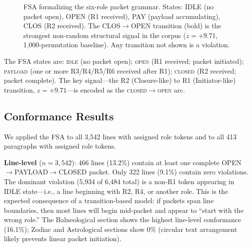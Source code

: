 \documentclass[11pt,a4paper,twocolumn]{article}
\begin{document}
\begin{figure}[H]
\centering
{}
\caption{FSA formalizing the six-role packet grammar. States: IDLE (no packet open), OPEN (R1 received), PAY (payload accumulating), CLOS (R2 received). The CLOS$\to$OPEN transition (bold) is the strongest non-random structural signal in the corpus ($z = +9.71$, 1,000-permutation baseline). Any transition not shown is a violation.}
\label{fig:fsa}
\end{figure}

The FSA states are: \textsc{idle} (no packet open); \textsc{open} (R1 received; packet initiated); \textsc{payload} (one or more R3/R4/R5/R6 received after R1); \textsc{closed} (R2 received; packet complete). The key signal---the R2 (Closure-like) to R1 (Initiator-like) transition, $z = +9.71$---is encoded as the \textsc{closed}$\to$\textsc{open} arc.

\subsection{Conformance Results}

We applied the FSA to all 3,542 lines with assigned role tokens and to all 413 paragraphs with assigned role tokens.

\textbf{Line-level} ($n = 3{,}542$): 466 lines (13.2\%) contain at least one complete OPEN$\to$PAYLOAD$\to$CLOSED packet. Only 322 lines (9.1\%) contain zero violations. The dominant violation (5,934 of 6,484 total) is a non-R1 token appearing in IDLE state---i.e., a line beginning with R2, R4, or another role. This is the expected consequence of a transition-based model: if packets span line boundaries, then most lines will begin mid-packet and appear to ``start with the wrong role.'' The Balneological section shows the highest line-level conformance (16.1\%); Zodiac and Astrological sections show 0\% (circular text arrangement likely prevents linear packet initiation).
\end{document}
